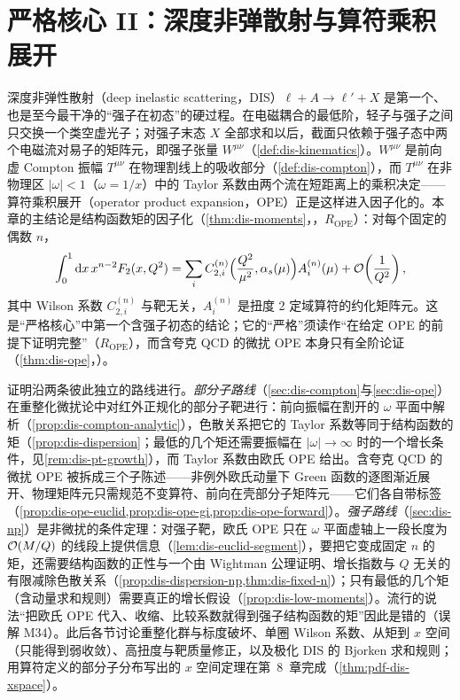 \chapter{严格核心 II：深度非弹散射与算符乘积展开}\label{ch:dis}

深度非弹性散射（deep inelastic scattering，DIS）$\ell+A\to\ell'+X$ 是第一个、也是至今最干净的“强子在初态”的硬过程。在电磁耦合的最低阶，轻子与强子之间只交换一个类空虚光子；对强子末态 $X$ 全部求和以后，截面只依赖于强子态中两个电磁流对易子的矩阵元，即强子张量 $W^{\mu\nu}$（\cref{def:dis-kinematics}）。$W^{\mu\nu}$ 是前向虚 Compton 振幅 $T^{\mu\nu}$ 在物理割线上的吸收部分（\cref{def:dis-compton}），而 $T^{\mu\nu}$ 在非物理区 $|\omega|<1$（$\omega=1/x$）中的 Taylor 系数由两个流在短距离上的乘积决定——算符乘积展开（operator product expansion，OPE）正是这样进入因子化的。本章的主结论是结构函数矩的因子化（\cref{thm:dis-moments}，\tagR，$R_{\mathrm{OPE}}$）：对每个固定的偶数 $n$，
\[
\int_0^1\mathrm{d} x\,x^{n-2}F_2(x,Q^2)=\sum_iC^{(n)}_{2,i}\Big(\frac{Q^2}{\mu^2},\alpha_s(\mu)\Big)A^{(n)}_i(\mu)+\mathcal{O}\!\left(\frac{1}{Q^2}\right),
\]
其中 Wilson 系数 $C^{(n)}_{2,i}$ 与靶无关，$A^{(n)}_i$ 是扭度 2 定域算符的约化矩阵元。这是“严格核心”中第一个含强子初态的结论；它的“严格”须读作“在给定 OPE 的前提下证明完整”（$R_{\mathrm{OPE}}$），而含夸克 QCD 的微扰 OPE 本身只有全阶论证（\cref{thm:dis-ope}，\tagA）。

证明沿两条彼此独立的路线进行。\emph{部分子路线}（\cref{sec:dis-compton}与\cref{sec:dis-ope}）在重整化微扰论中对红外正规化的部分子靶进行：前向振幅在割开的 $\omega$ 平面中解析（\cref{prop:dis-compton-analytic}），色散关系把它的 Taylor 系数等同于结构函数的矩（\cref{prop:dis-dispersion}；最低的几个矩还需要振幅在 $|\omega|\to\infty$ 时的一个增长条件，见\cref{rem:dis-pt-growth}），而 Taylor 系数由欧氏 OPE 给出。含夸克 QCD 的微扰 OPE 被拆成三个子陈述——非例外欧氏动量下 Green 函数的逐图渐近展开、物理矩阵元只需规范不变算符、前向在壳部分子矩阵元——它们各自带标签（\cref{prop:dis-ope-euclid,prop:dis-ope-gi,prop:dis-ope-forward}）。\emph{强子路线}（\cref{sec:dis-np}）是非微扰的条件定理：对强子靶，欧氏 OPE 只在 $\omega$ 平面虚轴上一段长度为 $\mathcal{O}\!\left(M/Q\right)$ 的线段上提供信息（\cref{lem:dis-euclid-segment}），要把它变成固定 $n$ 的矩，还需要结构函数的正性与一个由 Wightman 公理证明、增长指数与 $Q$ 无关的有限减除色散关系（\cref{prop:dis-dispersion-np,thm:dis-fixed-n}）；只有最低的几个矩（含动量求和规则）需要真正的增长假设（\cref{prop:dis-low-moments}）。流行的说法“把欧氏 OPE 代入、收缩、比较系数就得到强子结构函数的矩”因此是错的（误解 M34）。此后各节讨论重整化群与标度破坏、单圈 Wilson 系数、从矩到 $x$ 空间（只能得到弱收敛）、高扭度与靶质量修正，以及极化 DIS 的 Bjorken 求和规则；用算符定义的部分子分布写出的 $x$ 空间定理在第~8~章完成（\cref{thm:pdf-dis-xspace}）。

